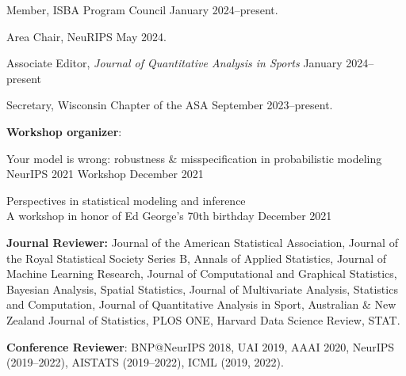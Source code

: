 \documentclass[margin]{res}
\begin{document}
\begin{resume}
Member, ISBA Program Council \hfill January 2024--present.

Area Chair, NeuRIPS \hfill May 2024.

Associate Editor, \textit{Journal of Quantitative Analysis in Sports} \hfill January 2024--present

Secretary, Wisconsin Chapter of the ASA \hfill September 2023--present.


\textbf{Workshop organizer}: 

Your model is wrong: robustness \& misspecification in probabilistic modeling \\
NeurIPS 2021 Workshop \hfill December 2021

Perspectives in statistical modeling and inference \\
A workshop in honor of Ed George's 70th birthday \hfill December 2021


\textbf{Journal Reviewer:} Journal of the American Statistical Association, Journal of the Royal Statistical Society Series B, Annals of Applied Statistics, Journal of Machine Learning Research, Journal of Computational and Graphical Statistics, Bayesian Analysis, Spatial Statistics, Journal of Multivariate Analysis, Statistics and Computation, Journal of Quantitative Analysis in Sport, Australian \& New Zealand Journal of Statistics, PLOS ONE, Harvard Data Science Review, STAT. 

\textbf{Conference Reviewer}: BNP@NeurIPS 2018, UAI 2019, AAAI 2020,  NeurIPS (2019--2022), AISTATS (2019--2022), ICML (2019, 2022).
\end{resume} 
\end{document}
